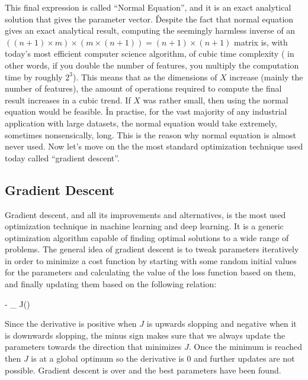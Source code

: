 This final expression is called ``Normal Equation'', and it is an exact analytical solution that gives the
parameter vector. \v

Despite the fact that normal equation gives an exact analytical result, computing the seemingly harmless inverse of
an $((n+1) \times m) \times (m \times (n+1) ) = (n+1) \times (n+1)$ matrix is, with today's most efficient computer
science algorithm, of cubic time complexity ( in other words, if you double the number of features, you multiply the
computation time by roughly $2^3$). This means that as the dimensions of $X$ increase (mainly the number of features),
the amount of operations required to compute the final result increases in a cubic trend. If $X$ was rather small,
then using the normal equation would be feasible. \v

In practise, for the vast majority of any industrial application with large datasets, the normal equation would take
extremely, sometimes nonsensically, long. This is the reason why normal equation is almost never used. Now let's move
on the the most standard optimization technique used today called ``gradient descent''.

\subsection{Gradient Descent}

Gradient descent, and all its improvements and alternatives, is the most used optimization technique in machine
learning and deep learning. It is a generic optimization algorithm capable of finding optimal solutions to a wide
range of problems. The general idea of gradient descent is to tweak parameters iteratively in order to minimize a
cost function by starting with some random initial values for the parameters and calculating the value of the loss
function based on them, and finally updating them based on the following relation:

\bse
{} \coloneqq {} - \alpha \nabla_{} J()
\ese
\ed

Since the derivative is positive when $J$ is upwards slopping and negative when it is downwards slopping, the minus
sign makes sure that we always update the parameters towards the direction that minimizes $J$. Once the minimum is
reached then $J$ is at a global optimum so the derivative is 0 and further updates are not possible. Gradient descent
is over and the best parameters have been found.

